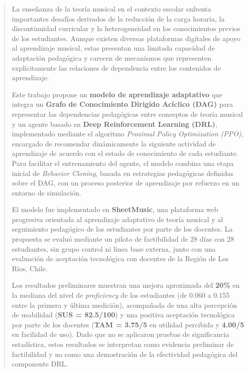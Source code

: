 \begin{abstract}
La enseñanza de la teoría musical en el contexto escolar enfrenta importantes desafíos derivados de la reducción de la carga horaria, la discontinuidad curricular y la heterogeneidad en los conocimientos previos de los estudiantes. Aunque existen diversas plataformas digitales de apoyo al aprendizaje musical, estas presentan una limitada capacidad de adaptación pedagógica y carecen de mecanismos que representen explícitamente las relaciones de dependencia entre los contenidos de aprendizaje.

Este trabajo propone un \textbf{modelo de aprendizaje adaptativo} que integra un \textbf{Grafo de Conocimiento Dirigido Acíclico (DAG)} para representar las dependencias pedagógicas entre conceptos de teoría musical y un agente basado en \textbf{Deep Reinforcement Learning (DRL)}, implementado mediante el algoritmo \textit{Proximal Policy Optimization (PPO)}, encargado de recomendar dinámicamente la siguiente actividad de aprendizaje de acuerdo con el estado de conocimiento de cada estudiante. Para facilitar el entrenamiento del agente, el modelo combina una etapa inicial de \textit{Behavior Cloning}, basada en estrategias pedagógicas definidas sobre el DAG, con un proceso posterior de aprendizaje por refuerzo en un entorno de simulación.

El modelo fue implementado en \textbf{SheetMusic}, una plataforma web progresiva orientada al aprendizaje adaptativo de teoría musical y al seguimiento pedagógico de los estudiantes por parte de los docentes. La propuesta se evaluó mediante un piloto de factibilidad de 28 días con 28 estudiantes, sin grupo control ni línea base externa, junto con una evaluación de aceptación tecnológica con docentes de la Región de Los Ríos, Chile.

Los resultados preliminares muestran una mejora aproximada del \textbf{20\%} en la mediana del nivel de \textit{proficiency} de los estudiantes (de 0.060 a 0.155 entre la primera y última medición), acompañada de una alta percepción de usabilidad (\textbf{SUS = 82.5/100}) y una positiva aceptación tecnológica por parte de los docentes (\textbf{TAM = 3.75/5} en utilidad percibida y \textbf{4.00/5} en facilidad de uso). Dado que no se aplicaron pruebas de significancia estadística, estos resultados se interpretan como evidencia preliminar de factibilidad y no como una demostración de la efectividad pedagógica del componente DRL.



\end{abstract}
